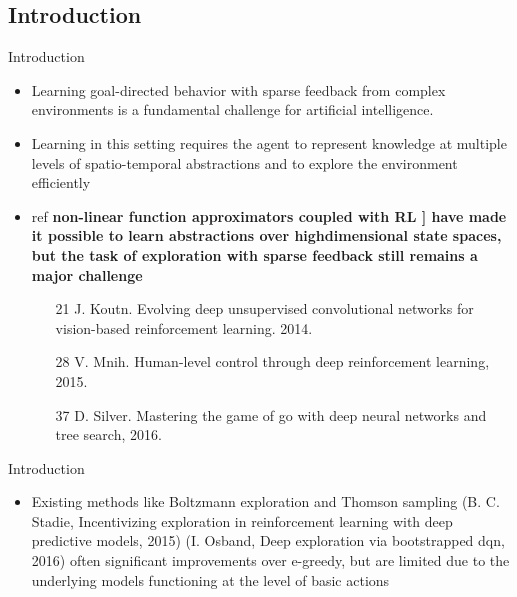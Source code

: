 \subsection{Introduction}
\begin{frame}{Introduction}{}
  \begin{itemize}
    
    \item Learning goal-directed behavior with sparse feedback from complex environments is a fundamental challenge for artificial intelligence.
    
    \item Learning in this setting requires the agent to represent knowledge at multiple levels of spatio-temporal abstractions and to explore the environment efficiently
    
    \item ref {\color{red} \bf{non-linear function approximators coupled with RL ] have made it possible to learn abstractions over highdimensional state spaces, but the task of exploration with sparse feedback still remains a major challenge}}
    
    \begin{itemize}
        \color{red}
        
        \item [21] J. Koutn. Evolving deep unsupervised convolutional networks for vision-based reinforcement learning. 2014.
        
        \item [28] V. Mnih. Human-level control through deep reinforcement learning, 2015.
        
        \item [37] D. Silver. Mastering the game of go with deep neural networks and tree search, 2016.
    \end{itemize}
    
  \end{itemize}
\end{frame}

\begin{frame}{Introduction}{}
  \begin{itemize}
    \item Existing methods like {\color{red} Boltzmann exploration and Thomson sampling (B. C. Stadie, Incentivizing exploration in reinforcement learning with deep predictive models, 2015) (I. Osband, Deep exploration via bootstrapped dqn, 2016) often significant improvements over e-greedy, but are limited due to the underlying models functioning at the level of basic actions}
  \end{itemize}
\end{frame}